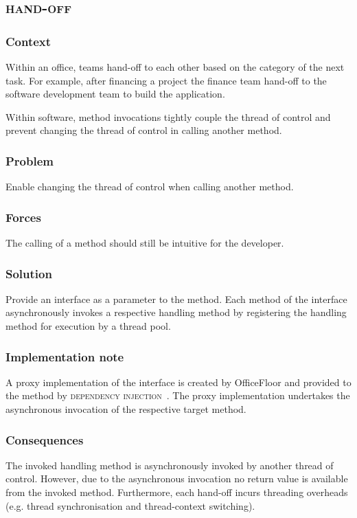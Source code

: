 \documentclass[prodmode]{style/acmlarge}
\begin{document}
\subsection{\textsc{\textbf{hand-off}}}

\subsubsection*{Context} Within an office, teams hand-off to each other based on
the category of the next task.  For example, after financing a project the
finance team hand-off to the software development team to build the application.

Within software, method invocations tightly couple the thread of control and
prevent changing the thread of control in calling another method.

\subsubsection*{\textbf{Problem}} Enable changing the thread of control when calling
another method.

\subsubsection*{Forces} The calling of a method should still be intuitive for
the developer.

\subsubsection*{\textbf{Solution}}  Provide an interface as a parameter to the
method.  Each method of the interface asynchronously invokes a respective
handling method by registering the handling method for execution by a thread
pool.

\subsubsection*{Implementation note} A proxy implementation of the interface is
created by OfficeFloor and provided to the method by \textsc{dependency
injection}~\cite{ioc}.  The proxy implementation undertakes the asynchronous
invocation of the respective target method.

\subsubsection*{Consequences} The invoked handling method is asynchronously
invoked by another thread of control.  However, due to the asynchronous
invocation no return value is available from the invoked method.  Furthermore,
each hand-off incurs threading overheads (e.g. thread synchronisation and
thread-context switching).
\end{document}
